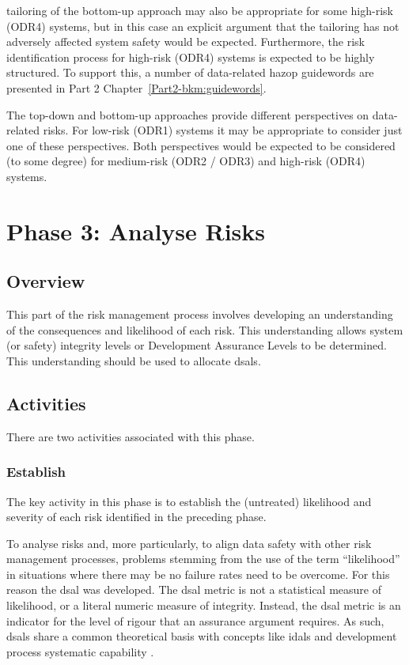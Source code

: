 \Gls{tailoring} of the bottom-up approach may also be appropriate for some high-risk (ODR4) systems, but in this case an explicit argument that the \gls{tailoring} has not adversely affected system safety would be expected. Furthermore, the risk identification process for high-risk (ODR4) systems is expected to be highly structured. To support this, a number of data-related \gls{hazop} guidewords are presented in Part 2 Chapter~\ref*{Part2-bkm:guidewords}.

The top-down and bottom-up approaches provide different perspectives on data-related risks. For low-risk (ODR1) systems it may be appropriate to consider just one of these perspectives. Both perspectives would be expected to be considered (to some degree) for medium-risk (ODR2 / ODR3) and high-risk (ODR4) systems.

\section{Phase 3: Analyse Risks}
\subsection{Overview}
This part of the risk management process involves developing an understanding of the consequences and likelihood of each risk. This understanding allows system (or safety) \gls{integrity} levels or Development Assurance Levels to be determined. This understanding should be used to allocate
\glspl{dsal}.
%
%
\subsection{Activities}
There are two activities associated with this phase.
%
\subsubsection{Establish }
\label{bkm:DSAL-table-section}
The key activity in this phase is to establish the (untreated) likelihood and severity of each risk identified in the preceding phase.

To analyse risks and, more particularly, to align data safety with other risk management processes, problems stemming from the use of the term ``likelihood'' in situations where there may be no failure rates need to be overcome. For this reason the \gls{dsal} was developed. The \gls{dsal} metric is not a statistical measure of likelihood, or a literal numeric measure of \gls{integrity}. Instead, the \gls{dsal} metric is an indicator for the level of rigour that an assurance argument requires. As such, \glspl{dsal} share a common theoretical basis with concepts like \glspl{idal}  \cite{citation:arp4754a2010guidelines} and development process systematic capability \cite{citation:iec615083}.

